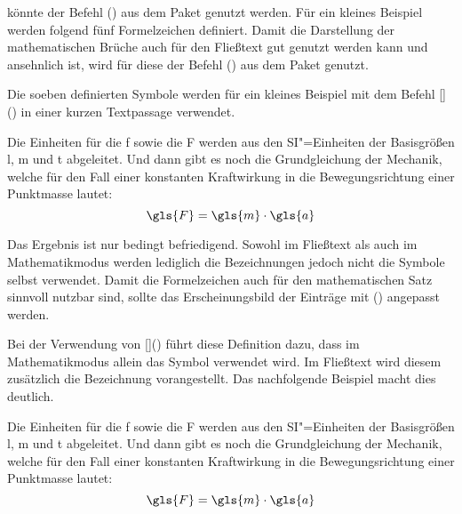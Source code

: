 \documentclass[%
  english,ngerman,%
  cdgeometry=no,DIV=12,automark,%
]{tudscrartcl}
\begin{document}
könnte der Befehl () aus dem Paket  
genutzt werden. Für ein kleines Beispiel werden folgend fünf Formelzeichen 
definiert. Damit die Darstellung der mathematischen Brüche auch für den 
Fließtext gut genutzt werden kann und ansehnlich ist, wird für diese der Befehl 
() aus dem Paket  genutzt.
%
\begin{Trunk*}

\end{Trunk*}
%
Die soeben definierten Symbole werden für ein kleines Beispiel mit dem Befehl 
[]() in einer kurzen 
Textpassage verwendet.
%
\begin{Hint*}
Die Einheiten für die \gls{f} sowie die \gls{F} werden aus den 
SI"=Einheiten der Basisgrößen \gls{l}, \gls{m} und \gls{t} abgeleitet.
Und dann gibt es noch die Grundgleichung der Mechanik, welche für den
Fall einer konstanten Kraftwirkung in die Bewegungsrichtung einer
Punktmasse lautet:
\[\gls{F} = \gls{m} \cdot \gls{a}\]
\end{Hint*}
%
Das Ergebnis ist nur bedingt befriedigend. Sowohl im Fließtext als auch im 
Mathematikmodus werden lediglich die Bezeichnungen jedoch nicht die Symbole 
selbst verwendet. Damit die Formelzeichen auch für den mathematischen Satz 
sinnvoll nutzbar sind, sollte das Erscheinungsbild der Einträge mit 
() angepasst werden.
%
\begin{Preamble*}
\end{Preamble*}
%
Bei der Verwendung von []() 
führt diese Definition dazu, dass im Mathematikmodus allein das Symbol 
verwendet wird. Im Fließtext wird diesem zusätzlich die Bezeichnung 
vorangestellt. Das nachfolgende Beispiel macht dies deutlich.
%
\begin{Trunk*}
Die Einheiten für die \gls{f} sowie die \gls{F} werden aus den
SI"=Einheiten der Basisgrößen \gls{l}, \gls{m} und \gls{t} abgeleitet.
Und dann gibt es noch die Grundgleichung der Mechanik, welche für den
Fall einer konstanten Kraftwirkung in die Bewegungsrichtung einer
Punktmasse lautet:
\[\gls{F} = \gls{m} \cdot \gls{a}\]

\end{Trunk*}
\end{document}
